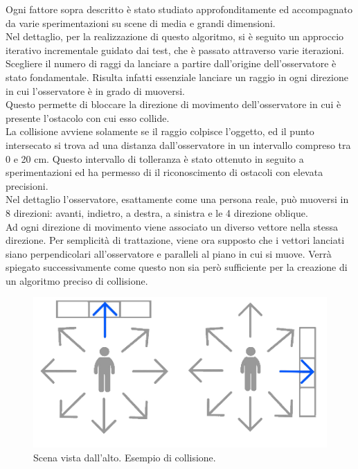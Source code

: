 Ogni fattore sopra descritto è stato studiato approfonditamente ed accompagnato da varie sperimentazioni su scene di media e grandi dimensioni.
\\
Nel dettaglio, per la realizzazione di questo algoritmo, si è seguito un approccio iterativo incrementale guidato dai test, che è passato attraverso varie iterazioni.
Scegliere il numero di raggi da lanciare a partire dall’origine dell’osservatore è stato fondamentale. Risulta infatti essenziale lanciare un raggio in ogni direzione in cui l’osservatore è in grado di muoversi.
\\
Questo permette di bloccare la direzione di movimento dell’osservatore in cui è presente l’ostacolo con cui esso collide.
\\
La collisione avviene solamente se il raggio colpisce l’oggetto, ed il punto intersecato si trova ad una distanza dall’osservatore in un intervallo compreso tra 0 e 20 cm. 
Questo intervallo di tolleranza è stato ottenuto in seguito a sperimentazioni ed ha permesso di il riconoscimento di ostacoli con elevata precisioni.
\\
Nel dettaglio l’osservatore, esattamente come una persona reale, può muoversi in 8 direzioni: avanti, indietro, a destra, a sinistra e le 4 direzione oblique.
\\
Ad ogni direzione di movimento viene associato un diverso vettore nella stessa direzione.
Per semplicità di trattazione, viene ora supposto che i vettori lanciati siano perpendicolari all’osservatore e paralleli al piano in cui si muove. Verrà spiegato successivamente come questo non sia però sufficiente per la creazione di un algoritmo preciso di collisione.

\begin{figure}[htb]
 \centering
 \includegraphics[width=1\linewidth]{images/chapter_navigazione_scena/collisioni1.png}\hfill
 \caption[Esempio di collisione.]{Scena vista dall'alto. Esempio di collisione.}
 \label{fig:navigazione_scena_collisioni1}
\end{figure}

